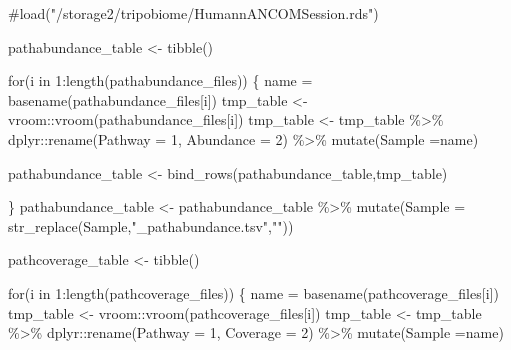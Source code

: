 \documentclass[
  letterpaper,
  DIV=11,
  numbers=noendperiod]{scrartcl}
\newenvironment{Shaded}{\begin{snugshade}}{\end{snugshade}}
\newcommand{\AttributeTok}[1]{\textcolor[rgb]{0.40,0.45,0.13}{#1}}
\newcommand{\CommentTok}[1]{\textcolor[rgb]{0.37,0.37,0.37}{#1}}
\newcommand{\ControlFlowTok}[1]{\textcolor[rgb]{0.00,0.23,0.31}{#1}}
\newcommand{\DecValTok}[1]{\textcolor[rgb]{0.68,0.00,0.00}{#1}}
\newcommand{\FunctionTok}[1]{\textcolor[rgb]{0.28,0.35,0.67}{#1}}
\newcommand{\NormalTok}[1]{\textcolor[rgb]{0.00,0.23,0.31}{#1}}
\newcommand{\OtherTok}[1]{\textcolor[rgb]{0.00,0.23,0.31}{#1}}
\newcommand{\SpecialCharTok}[1]{\textcolor[rgb]{0.37,0.37,0.37}{#1}}
\newcommand{\StringTok}[1]{\textcolor[rgb]{0.13,0.47,0.30}{#1}}
\begin{document}
\begin{Shaded}
\begin{Highlighting}[]
\CommentTok{\#load("/storage2/tripobiome/HumannANCOMSession.rds")}

\NormalTok{pathabundance\_table }\OtherTok{\textless{}{-}} \FunctionTok{tibble}\NormalTok{()}

\ControlFlowTok{for}\NormalTok{(i }\ControlFlowTok{in} \DecValTok{1}\SpecialCharTok{:}\FunctionTok{length}\NormalTok{(pathabundance\_files))}
\NormalTok{\{}
\NormalTok{  name }\OtherTok{=} \FunctionTok{basename}\NormalTok{(pathabundance\_files[i])}
\NormalTok{  tmp\_table }\OtherTok{\textless{}{-}}\NormalTok{ vroom}\SpecialCharTok{::}\FunctionTok{vroom}\NormalTok{(pathabundance\_files[i])}
\NormalTok{  tmp\_table }\OtherTok{\textless{}{-}}\NormalTok{ tmp\_table }\SpecialCharTok{\%\textgreater{}\%}\NormalTok{ dplyr}\SpecialCharTok{::}\FunctionTok{rename}\NormalTok{(}\AttributeTok{Pathway =} \DecValTok{1}\NormalTok{, }\AttributeTok{Abundance =} \DecValTok{2}\NormalTok{) }\SpecialCharTok{\%\textgreater{}\%} \FunctionTok{mutate}\NormalTok{(}\AttributeTok{Sample =}\NormalTok{name)}

\NormalTok{  pathabundance\_table }\OtherTok{\textless{}{-}} \FunctionTok{bind\_rows}\NormalTok{(pathabundance\_table,tmp\_table)}

\NormalTok{\}}
\NormalTok{pathabundance\_table }\OtherTok{\textless{}{-}}\NormalTok{ pathabundance\_table }\SpecialCharTok{\%\textgreater{}\%} \FunctionTok{mutate}\NormalTok{(}\AttributeTok{Sample =} \FunctionTok{str\_replace}\NormalTok{(Sample,}\StringTok{"\_pathabundance.tsv"}\NormalTok{,}\StringTok{""}\NormalTok{))}



\NormalTok{pathcoverage\_table }\OtherTok{\textless{}{-}} \FunctionTok{tibble}\NormalTok{()}

\ControlFlowTok{for}\NormalTok{(i }\ControlFlowTok{in} \DecValTok{1}\SpecialCharTok{:}\FunctionTok{length}\NormalTok{(pathcoverage\_files))}
\NormalTok{\{}
\NormalTok{  name }\OtherTok{=} \FunctionTok{basename}\NormalTok{(pathcoverage\_files[i])}
\NormalTok{  tmp\_table }\OtherTok{\textless{}{-}}\NormalTok{ vroom}\SpecialCharTok{::}\FunctionTok{vroom}\NormalTok{(pathcoverage\_files[i])}
\NormalTok{  tmp\_table }\OtherTok{\textless{}{-}}\NormalTok{ tmp\_table }\SpecialCharTok{\%\textgreater{}\%}\NormalTok{ dplyr}\SpecialCharTok{::}\FunctionTok{rename}\NormalTok{(}\AttributeTok{Pathway =} \DecValTok{1}\NormalTok{, }\AttributeTok{Coverage =} \DecValTok{2}\NormalTok{) }\SpecialCharTok{\%\textgreater{}\%} \FunctionTok{mutate}\NormalTok{(}\AttributeTok{Sample =}\NormalTok{name)}


\end{Highlighting}
\end{Shaded}
\end{document}
